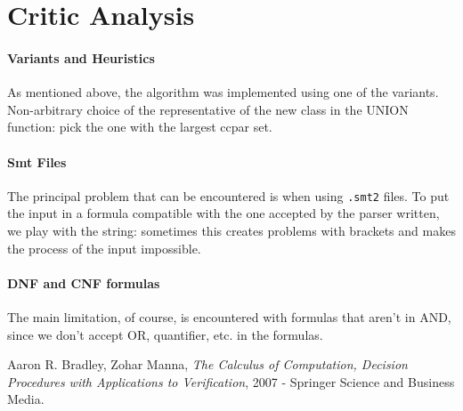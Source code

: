 \documentclass[11pt]{article}
\begin{document}
\section{Critic Analysis}
\paragraph{Variants and Heuristics}
As mentioned above, the algorithm was implemented using one of the variants. Non-arbitrary choice of the representative of the new class in the UNION function: pick the one with the largest ccpar set.

\paragraph{Smt Files}
The principal problem that can be encountered is when using \texttt{.smt2} files. To put the input in a formula compatible with the one accepted by the parser written, we play with the string: sometimes this creates problems with brackets and makes the process of the input impossible.

\paragraph{DNF and CNF formulas}
The main limitation, of course, is encountered with formulas that aren't in AND, since we don't accept OR, quantifier, etc. in the formulas.

\begin{thebibliography}{}
Aaron R. Bradley, Zohar Manna, \emph{The Calculus of Computation, Decision Procedures with Applications to Verification}, 2007 - Springer Science and Business Media.
 \end{thebibliography}
\end{document}

